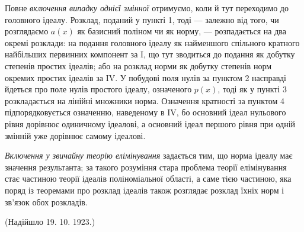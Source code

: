 \documentclass[11pt]{article}
\begin{document}
Повне \emph{включення випадку однієї змінної} отримуємо, коли й тут переходимо до головного ідеалу. Розклад, поданий у пункті 1, тоді --- залежно від того, чи розглядаємо $a(x)$ як базисний поліном чи як норму, --- розпадається на два окремі розклади: на подання головного ідеалу як найменшого спільного кратного найбільших первинних компонент за I, що тут зводиться до подання як добутку степенів простих ідеалів; або на розклад норми як добутку степенів норм окремих простих ідеалів за IV. У побудові поля нулів за пунктом 2 насправді йдеться про поле нулів простого ідеалу, означеного $p(x)$, тоді як у пункті 3 розкладається на лінійні множники норма. Означення кратності за пунктом 4 підпорядковується означенню, наведеному в IV, бо основний ідеал нульового рівня дорівнює одиничному ідеалові, а основний ідеал першого рівня при одній змінній уже дорівнює самому ідеалові.

\emph{Включення у звичайну теорію елімінування} задається тим, що норма ідеалу має значення результанта; за такого розуміння стара проблема теорії елімінування стає частиною теорії ідеалів поліноміальної області, а саме тією частиною, яка поряд із теоремами про розклад ідеалів також розглядає розклад їхніх норм і зв'язок обох розкладів.

\begin{center}
(Надійшло 19. 10. 1923.)
\end{center}
\end{document}

